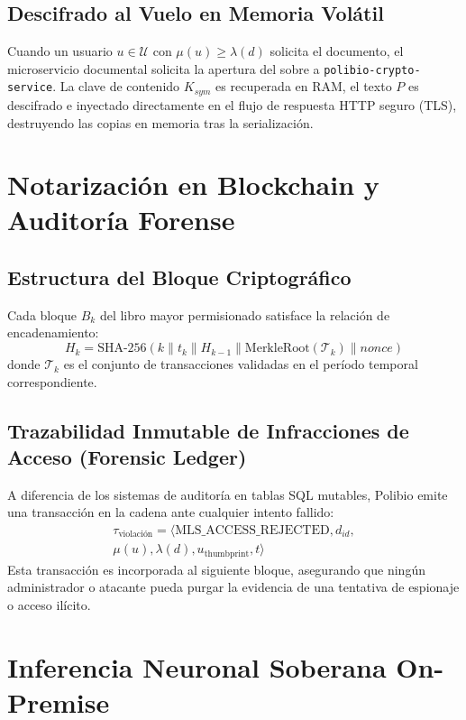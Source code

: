 \documentclass[journal,10pt]{IEEEtran}
\begin{document}
\subsection{Descifrado al Vuelo en Memoria Volátil}
Cuando un usuario $u \in \mathcal{U}$ con $\mu(u) \ge \lambda(d)$ solicita el documento, el microservicio documental solicita la apertura del sobre a \texttt{polibio-crypto-service}. La clave de contenido $K_{sym}$ es recuperada en RAM, el texto $P$ es descifrado e inyectado directamente en el flujo de respuesta HTTP seguro (TLS), destruyendo las copias en memoria tras la serialización.

\section{Notarización en Blockchain y Auditoría Forense}
\subsection{Estructura del Bloque Criptográfico}
Cada bloque $B_k$ del libro mayor permisionado satisface la relación de encadenamiento:
\begin{equation}
H_k = \text{SHA-256}(k \parallel t_k \parallel H_{k-1} \parallel \text{MerkleRoot}(\mathcal{T}_k) \parallel nonce)
\end{equation}
donde $\mathcal{T}_k$ es el conjunto de transacciones validadas en el período temporal correspondiente.

\subsection{Trazabilidad Inmutable de Infracciones de Acceso (Forensic Ledger)}
A diferencia de los sistemas de auditoría en tablas SQL mutables, Polibio emite una transacción en la cadena ante cualquier intento fallido:
\begin{equation}
\begin{split}
\tau_{\text{violación}} = \langle \text{MLS\_ACCESS\_REJECTED}, d_{id}, \\
\mu(u), \lambda(d), u_{\text{thumbprint}}, t \rangle
\end{split}
\end{equation}
Esta transacción es incorporada al siguiente bloque, asegurando que ningún administrador o atacante pueda purgar la evidencia de una tentativa de espionaje o acceso ilícito.

\section{Inferencia Neuronal Soberana On-Premise}
\end{document}
